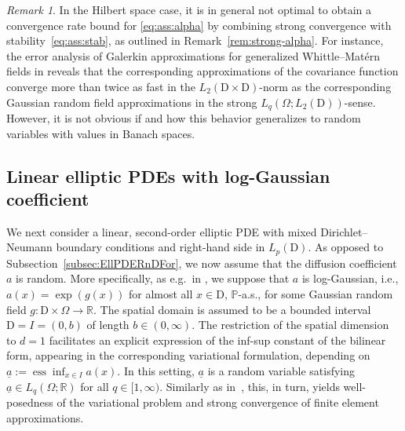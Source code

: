 \documentclass[reqno]{amsart}
\numberwithin{equation}{section}
\newcommand{\bbP}{\mathbb{P}}
\newcommand{\bbR}{\mathbb{R}}
\newcommand{\dom}{\mathrm{D}}
\newcommand{\from}{\colon}
\theoremstyle{remark}
\newtheorem{remark}[lemma]{Remark}
\theoremstyle{definition}
\begin{document}
\begin{remark} 
	In the Hilbert space case, 
	it is in general not optimal 
	to obtain a convergence rate bound for \eqref{eq:ass:alpha} 
	by combining strong convergence with  
	stability~\eqref{eq:ass:stab}, as outlined 
	in Remark~\ref{rem:strong-alpha}. 
	For instance, the error analysis 
	of Galerkin approximations for 
	generalized Whittle--Mat\'ern fields 
	in \cite[Proposition~4]{CoxKirchner2020}  
	reveals that the corresponding 
	approximations of the covariance function  
	converge more than twice as fast 
	in the $L_2(\dom{\times}\dom)$-norm 
	as the corresponding Gaussian random field approximations 
	in the strong $L_q(\Omega;L_2(\dom))$-sense. 
	However, it is not obvious if and how 
	this behavior generalizes to random variables 
	with values in Banach spaces.  
\end{remark} 

\subsection{Linear elliptic PDEs with log-Gaussian coefficient}
\label{subsec:EllPDERndCoef}

We next consider a linear, second-order elliptic PDE 
with mixed Dirichlet--Neumann boundary conditions 
and right-hand side in $L_p(\dom)$. 
As opposed to Subsection~\ref{subsec:EllPDERnDFor}, 
we now assume that the 
diffusion coefficient $a$ is random. 
More specifically, 
as e.g.\ in \cite{Charrier2012, 
	CharrierScheichlTeckentrup2013,
	TeckentrupScheichlGilesUllmann2013}, 
we suppose that 
$a$ is log-Gaussian, 
i.e., $a(x) = \exp(g(x))$ 
for almost all $x\in\dom$, $\bbP$-a.s.,  
for some Gaussian random field
$g\from\dom\times\Omega\to\bbR$. 
%
The spatial domain is assumed to be a bounded interval 
$\dom = I = (0,b)$ of length $b\in(0,\infty)$. 
%
The restriction of the spatial dimension to $d=1$ 
facilitates an explicit expression of the inf-sup constant 
of the bilinear form, 
appearing in the corresponding 
variational formulation, 
depending on 
$\underline{a}:=\operatorname{ess} \inf_{x\in I} a(x)$.  
In this setting, $\underline{a}$ is a random variable 
satisfying $\underline{a} \in L_q(\Omega;\bbR)$ 
for all $q\in[1,\infty)$. 
Similarly as in~\cite{Charrier2012}, 
this, in turn, yields well-posedness 
of the variational problem 
and strong convergence 
of finite element approximations. 

\end{document}
